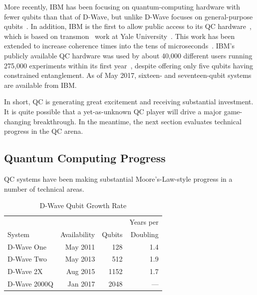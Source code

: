 More recently, IBM has been focusing on quantum-computing hardware with
fewer qubits than that of D-Wave, but unlike D-Wave focuses on
general-purpose
qubits~\cite{BradJones2017IBM-QC-Announce,RobertHackett2017IBM-QC-Announce,AgamShah2017IBM-QC-50-qubit,DarioGill2017IBM-Universal-QC}.
In addition, IBM is the first to allow public access to its QC
hardware~\cite{IBM2016QuantumExperience,ArsTechnica2016IBMQuantumExperience,MikeVizard2017IBM-QC-Cloud},
which is based on transmon~\cite{WikipediaTransMon} work at
Yale University~\cite{PhysRevA.76.042319}.
This work has been extended
to increase coherence times into the tens of
microseconds~\cite{PhysRevLett.107.240501,PhysRevLett.111.080502,PhysRevB.86.100506}.
IBM's publicly available QC hardware was used by about 40,000 different
users running 275,000 experiments within its first
year~\cite{SeanMichaelKerner2017IBM-QC-API},
despite offering only five qubits having constrained entanglement.
As of May 2017, sixteen- and seventeen-qubit systems are available
from IBM.

In short, QC is generating great excitement and receiving substantial
investment.
It is quite possible that a yet-as-unknown QC player will drive a
major game-changing breakthrough.
In the meantime, the next section evaluates technical progress in the
QC arena.

\subsection{Quantum Computing Progress}
\label{sec:future:Quantum Computing Progress}

QC systems have been making substantial Moore's-Law-style progress
in a number of technical areas.

\begin{table}
\begin{tabular}{l|r|r|r}
	&	&	& Years per \\
System
	& Availability
		& Qubits
			& Doubling \\
\hline
\hline
D-Wave One
	& May 2011
		& 128
			& 1.4 \\
\hline
D-Wave Two
	& May 2013
		& 512
			& 1.9 \\
\hline
D-Wave 2X
	& Aug 2015
		& 1152
			& 1.7 \\
\hline
D-Wave 2000Q
	& Jan 2017
		& 2048
			& --- \\
\end{tabular}
\caption{D-Wave Qubit Growth Rate}
\label{tab:future:D-Wave Qubit Growth Rate}
\end{table}

